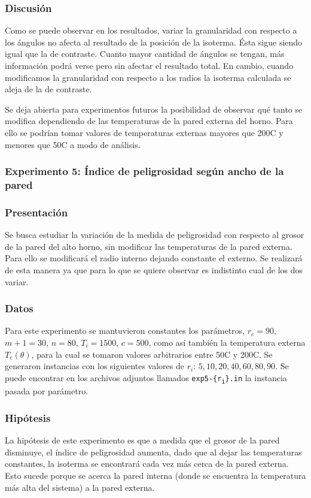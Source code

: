       \subsubsection*{Discusión}
        Como se puede observar en los resultados, variar la granularidad con respecto a los ángulos no afecta al resultado de la posición de la isoterma. Ésta sigue siendo igual que la de contraste. Cuanto mayor cantidad de ángulos se tengan, más información podrá verse pero sin afectar el resultado total. En cambio, cuando modificamos la granularidad con respecto a los radios la isoterma calculada se aleja de la de contraste.

        Se deja abierta para experimentos futuros la posibilidad de observar qué tanto se modifica dependiendo de las temperaturas de la pared externa del horno. Para ello se podrían tomar valores de temperaturas externas mayores que 200{\degree}C y menores que 50{\degree}C a modo de análisis.

    \subsubsection{Experimento 5: Índice de peligrosidad según ancho de la pared}

      \subsubsection*{Presentación}
        Se busca estudiar la variación de la medida de peligrosidad con respecto al grosor de la pared del alto horno, sin modificar las temperaturas de la pared externa. Para ello se modificará el radio interno dejando constante el externo. Se realizará de esta manera ya que para lo que se quiere observar es indistinto cual de los dos variar. 

      \subsubsection*{Datos}
        Para este experimento se mantuvieron constantes los parámetros, $r_e = 90$, $m+1 = 30$, $n = 80$, $T_i = 1500$, $c = 500$, como así también la temperatura externa $T_e(\theta)$, para la cual se tomaron valores arbitrarios entre 50{\degree}C y 200{\degree}C. Se generaron instancias con los siguientes valores de $r_i$: $5, 10, 20, 40, 60, 80, 90$.  Se puede encontrar en los archivos adjuntos llamados \texttt{exp5-\{r\textsubscript{i}\}.in} la instancia pasada por parámetro.
     
      \subsubsection*{Hipótesis}
        La hipótesis de este experimento es que a medida que el grosor de la pared disminuye, el índice de peligrosidad aumenta, dado que al dejar las temperaturas constantes, la isoterma se encontrará cada vez más cerca de la pared externa. Esto sucede porque se acerca la pared interna (donde se encuentra la temperatura más alta del sistema) a la pared externa.
        
